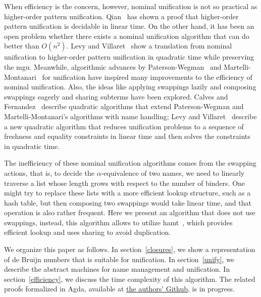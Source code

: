 \documentclass[a4paper,UKenglish]{lipics-v2016}
\begin{document}
When efficiency is the concern, however, nominal unification is not so practical as higher-order pattern unification.
Qian~\cite{qian_unification_1996} has shown a proof that higher-order pattern unification is decidable in linear time.
On the other hand, it has been an open problem
whether there exists a nominal unification algorithm
that can do better than $O(n^2)$.
Levy and Villaret~\cite{levy_nominal_2012} show a translation from nominal unification to higher-order pattern unification
in quadratic time while preserving the mgu.
Meanwhile, algorithmic advances by Paterson-Wegman~\cite{paterson_linear_1978} and Martelli-Montanari~\cite{martelli_efficient_1982} for unification
have inspired many improvements to the efficiency of nominal unification.
Also, the ideas like applying swappings lazily and composing swappings eagerly and sharing subterms have been explored.
Calves and Fernandez~\cite{calves_polynomial_2008, calves_complexity_2010, calves_first-order_2010}
describe quadratic
algorithms that extend Paterson-Wegman and Martelli-Montanari's
algorithms with name handling; Levy and
Villaret~\cite{levy_efficient_2010} describe a new quadratic algorithm
that reduces unification problems to a sequence of freshness and
equality constraints in linear time and then solves the constraints in quadratic time.

The inefficiency of these nominal unification algorithms
comes from the swapping actions, that is,
to decide the $\alpha$-equivalence of two names,
we need to linearly traverse a list
whose length grows with respect to the number of binders.
One might try to replace these lists with a more efficient lookup
structure, such as a hash table,
but then composing two swappings would take linear time,
and that operation is also rather frequent.
Here we present an algorithm that does not use swappings,
instead, this algorithm allows to utilize hamt~\cite{bagwell_ideal_2001},
which provides efficient lookup and uses sharing to avoid duplication.

  We organize this paper as follows.
  In section~\ref{closures}, we show a representation of
  de Bruijn numbers that is suitable for unification.
  In section~\ref{unify}, we describe the abstract machines
  for name management and unification.
  In section~\ref{efficiency}, we discuss the time complexity of this algorithm.
  The related proofs formalized in Agda,
  available at \href{https://github.com/mvcccccc/UNIF2018}{the authors' Github},
  is in progress.
  
\end{document}
